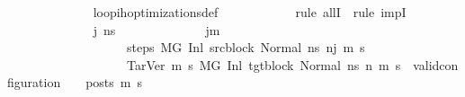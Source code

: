 \begin{isabellebody}
\ \ \ \ \ \ \ \ \ \ \ \ \isamarkupfalse%
\ loop{\isacharunderscore}{\kern0pt}ih{\isacharunderscore}{\kern0pt}optimizations{\isacharunderscore}{\kern0pt}def\isanewline
\ \ \ \ \ \ \ \ \ \ \isamarkupfalse%
\ {\isacharparenleft}{\kern0pt}rule\ allI\ {\isacharbar}{\kern0pt}\ rule\ impI{\isacharparenright}{\kern0pt}{\isacharplus}{\kern0pt}\isanewline
\ \ \ \ \ \ \ \ \ \ \ \ \isamarkupfalse%
\ j{\isacharprime}{\kern0pt}\ ns{}{\isacharprime}{\kern0pt}\isanewline
\ \ \ \ \ \ \ \ \ \ \ \ \isamarkupfalse%
\ {\isachardoublequoteopen}j{\isacharprime}{\kern0pt}{\isasymle}m{\isachardoublequoteclose}\ \isanewline
\ \ \ \ \ \ \ \ \ \ \ \ \ \ \ \ \ \ \ steps{\isacharcolon}{\kern0pt}\ {\isachardoublequoteopen}M{\isacharcomma}{\kern0pt}{\isasymLambda}{\isacharcomma}{\kern0pt}{\isasymGamma}{\isacharcomma}{\kern0pt}{\isasymOmega}{\isacharcomma}{\kern0pt}G\ {\isasymturnstile}{\isacharparenleft}{\kern0pt}Inl\ src{\isacharunderscore}{\kern0pt}block{\isacharcomma}{\kern0pt}\ Normal\ ns{}{\isacharprime}{\kern0pt}{\isacharparenright}{\kern0pt}\ {\isacharminus}{\kern0pt}n{\isasymrightarrow}{\isacharcircum}{\kern0pt}j{\isacharprime}{\kern0pt}\ {\isacharparenleft}{\kern0pt}m{\isacharprime}{\kern0pt}{\isacharcomma}{\kern0pt}\ s{\isacharprime}{\kern0pt}{\isacharparenright}{\kern0pt}{\isachardoublequoteclose}\ \isanewline
\ \ \ \ \ \ \ \ \ \ \ \ \ \ \ \ \ \ \ TarVer{\isacharcolon}{\kern0pt}\ {\isachardoublequoteopen}{\isasymforall}m{}{\isacharprime}{\kern0pt}\ s{}{\isacharprime}{\kern0pt}{\isachardot}{\kern0pt}\ {\isacharparenleft}{\kern0pt}M{\isacharcomma}{\kern0pt}{\isasymLambda}{\isacharcomma}{\kern0pt}{\isasymGamma}{\isacharcomma}{\kern0pt}{\isasymOmega}{\isacharcomma}{\kern0pt}G{\isacharprime}{\kern0pt}\ {\isasymturnstile}{\isacharparenleft}{\kern0pt}Inl\ tgt{\isacharunderscore}{\kern0pt}block{\isacharcomma}{\kern0pt}\ Normal\ ns{}{\isacharprime}{\kern0pt}{\isacharparenright}{\kern0pt}\ {\isacharminus}{\kern0pt}n{\isasymrightarrow}{\isacharasterisk}{\kern0pt}\ {\isacharparenleft}{\kern0pt}m{}{\isacharprime}{\kern0pt}{\isacharcomma}{\kern0pt}\ s{}{\isacharprime}{\kern0pt}{\isacharparenright}{\kern0pt}{\isacharparenright}{\kern0pt}\ {\isasymlongrightarrow}\ valid{\isacharunderscore}{\kern0pt}configuration\ {\isasymLambda}\ {\isasymGamma}\ {\isasymOmega}\ posts\ m{}{\isacharprime}{\kern0pt}\ s{}{\isacharprime}{\kern0pt}{\isachardoublequoteclose}\isanewline

\end{isabellebody}
